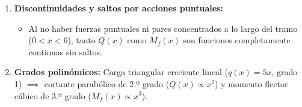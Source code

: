 {\begin{enumerate}
        \item \textbf{Discontinuidades y saltos por acciones puntuales:}

              \begin{itemize}

                  \item Al no haber fuerzas puntuales ni pares concentrados a lo largo del tramo ($0 < x < 6$), tanto $Q(x)$ como $M_f(x)$ son funciones completamente continuas sin saltos.

              \end{itemize}

        \item \textbf{Grados polinómicos:} Carga triangular creciente lineal ($q(x) = 5x$, grado 1) $\implies$ cortante parabólico de 2.º grado ($Q(x) \propto x^2$) y momento flector cúbico de 3.º grado ($M_f(x) \propto x^3$).

    \end{enumerate}

}






